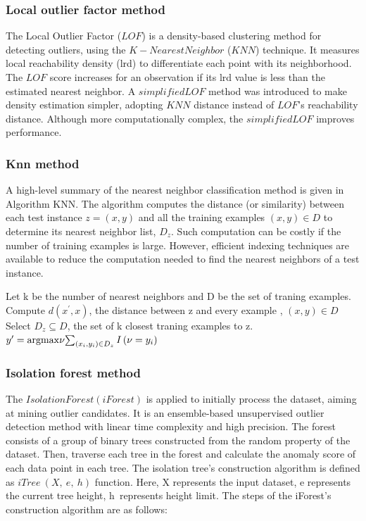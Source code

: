 \documentclass[preprint,12pt]{elsarticle}
\begin{document}
\subsubsection{Local outlier factor method}
\label{sec3_2_6}
The Local Outlier Factor ($LOF$) is a density-based clustering method for detecting outliers, using the $K-Nearest Neighbor$ ($KNN$) technique. It measures local reachability density (lrd) to differentiate each point with its neighborhood. The $LOF$ score increases for an observation if its lrd value is less than the estimated nearest neighbor. A $simplifiedLOF$ method was introduced to make density estimation simpler, adopting $KNN$ distance instead of $LOF$’s reachability distance. Although more computationally complex, the $simplifiedLOF$ improves performance.

\subsubsection{Knn method}
\label{sec3_2_7}

A high-level summary of the nearest neighbor classification method is given in Algorithm KNN. The algorithm computes the distance (or similarity) between each test instance $z = (x,y)$ and all the training examples $(x,y) \in D $ to determine its nearest neighbor list, $D_z$. Such computation can be costly if the number of training examples is large. However, efficient indexing techniques are available to reduce the computation needed to find the nearest neighbors
of a test instance.\\

\begin{algorithm}
	\caption{The K-nearest neighbor classifier}\label{your_label}
	\begin{algorithmic}
		\STATE  Let k be the number of nearest neighbors and D be the set of traning examples.
		\STATE Compute $d(x^\prime, x )$, the distance between z and every example , $(x,y)\in D$
		\STATE Select $D_z\subseteq D$, the set of k closest traning examples to z.
		\STATE $y^\prime={\rm argmax}\nu{\sum_{\left(x_i,y_i\right)\in D_z} I\left(\nu=y_i\right)}$
		\ENDFOR
	\end{algorithmic}
\end{algorithm}



\subsubsection{Isolation forest method}
\label{sec3_2_8}
The $Isolation Forest(iForest)$ is applied to initially process the dataset, aiming at mining outlier candidates. It is an ensemble-based unsupervised outlier detection method with linear time complexity and high precision. The forest consists of a group of binary trees constructed from the random property of the dataset. Then, traverse each tree in the forest and calculate the anomaly score of each data point in each tree. The isolation tree’s construction algorithm is defined as $iTree\ (X,\ e,\ h)$ function. Here, X represents the input dataset, e represents the current tree height, h\ represents height limit. The steps of the iForest’s construction algorithm are as follows: 
\end{document}

